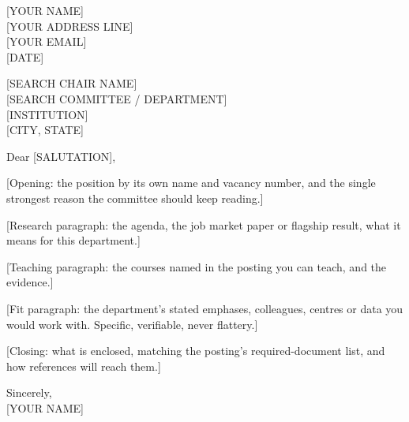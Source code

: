 \documentclass[11pt]{article}
\begin{document}
\begin{flushright}
{[YOUR NAME]}\\
{[YOUR ADDRESS LINE]}\\
{[YOUR EMAIL]} \quad\textbar{}\\
{[DATE]}
\end{flushright}

\vspace{6pt}

{[SEARCH CHAIR NAME]}\\
{[SEARCH COMMITTEE / DEPARTMENT]}\\
{[INSTITUTION]}\\
{[CITY, STATE]}

\vspace{6pt}

Dear [SALUTATION],

[Opening: the position by its own name and vacancy number, and the single
strongest reason the committee should keep reading.]

[Research paragraph: the agenda, the job market paper or flagship result, what
it means for this department.]

[Teaching paragraph: the courses named in the posting you can teach, and the
evidence.]

[Fit paragraph: the department's stated emphases, colleagues, centres or data
you would work with. Specific, verifiable, never flattery.]

[Closing: what is enclosed, matching the posting's required-document list, and
how references will reach them.]

\vspace{10pt}

Sincerely,\\[18pt]
{[YOUR NAME]}
\end{document}
